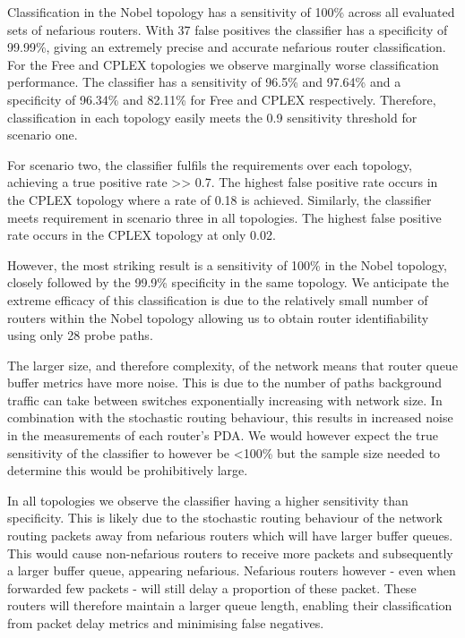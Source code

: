 Classification in the Nobel topology has a sensitivity of 100\% across all evaluated sets of nefarious routers. With 37 false positives the classifier has a specificity of 99.99\%, giving an extremely precise and accurate nefarious router classification. For the Free and CPLEX topologies we observe marginally worse classification performance. The classifier has a sensitivity of 96.5\% and 97.64\% and a specificity of 96.34\% and 82.11\% for Free and CPLEX respectively. Therefore, classification in each topology easily meets the 0.9 sensitivity threshold for scenario one.\par
For scenario two, the classifier fulfils the requirements over each topology, achieving a true positive rate >> 0.7. The highest false positive rate occurs in the CPLEX topology where a rate of 0.18 is achieved. Similarly, the classifier meets requirement in scenario three in all topologies. The highest false positive rate occurs in the CPLEX topology at only 0.02.\par
However, the most striking result is a sensitivity of 100\% in the Nobel topology, closely followed by the 99.9\% specificity in the same topology. We anticipate the extreme efficacy of this classification is due to the relatively small number of routers within the Nobel topology allowing us to obtain router identifiability using only 28 probe paths.\par
The larger size, and therefore complexity, of the network means that router queue buffer metrics have more noise. This is due to the number of paths background traffic can take between switches exponentially increasing with network size. In combination with the stochastic routing behaviour, this results in increased noise in the measurements of each router's PDA. We would however expect the true sensitivity of the classifier to however be <100\% but the sample size needed to determine this would be prohibitively large.\par
In all topologies we observe the classifier having a higher sensitivity than specificity. This is likely due to the stochastic routing behaviour of the network routing packets away from nefarious routers which will have larger buffer queues. This would cause non-nefarious routers to receive more packets and subsequently a larger buffer queue, appearing nefarious. Nefarious routers however - even when forwarded few packets - will still delay a proportion of these packet. These routers will therefore maintain a larger queue length, enabling their classification from packet delay metrics and minimising false negatives.\par

